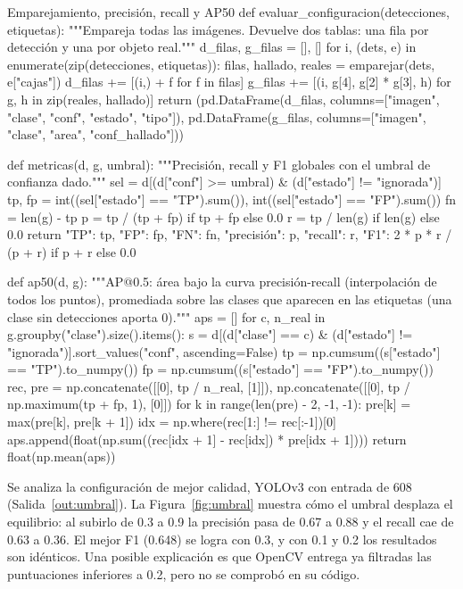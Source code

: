 \documentclass[11pt,letterpaper]{article}
\begin{document}
\begin{codigo}[label=cod:eval]{Emparejamiento, precisión, recall y AP50}
def evaluar_configuracion(detecciones, etiquetas):
    """Empareja todas las imágenes. Devuelve dos tablas: una fila por detección y una por objeto real."""
    d_filas, g_filas = [], []
    for i, (dets, e) in enumerate(zip(detecciones, etiquetas)):
        filas, hallado, reales = emparejar(dets, e["cajas"])
        d_filas += [(i,) + f for f in filas]
        g_filas += [(i, g[4], g[2] * g[3], h) for g, h in zip(reales, hallado)]
    return (pd.DataFrame(d_filas, columns=["imagen", "clase", "conf", "estado", "tipo"]),
            pd.DataFrame(g_filas, columns=["imagen", "clase", "area", "conf_hallado"]))


def metricas(d, g, umbral):
    """Precisión, recall y F1 globales con el umbral de confianza dado."""
    sel = d[(d["conf"] >= umbral) & (d["estado"] != "ignorada")]
    tp, fp = int((sel["estado"] == "TP").sum()), int((sel["estado"] == "FP").sum())
    fn = len(g) - tp
    p = tp / (tp + fp) if tp + fp else 0.0
    r = tp / len(g) if len(g) else 0.0
    return {"TP": tp, "FP": fp, "FN": fn, "precisión": p, "recall": r, "F1": 2 * p * r / (p + r) if p + r else 0.0}


def ap50(d, g):
    """AP@0.5: área bajo la curva precisión-recall (interpolación de todos los puntos), promediada sobre las
    clases que aparecen en las etiquetas (una clase sin detecciones aporta 0)."""
    aps = []
    for c, n_real in g.groupby("clase").size().items():
        s = d[(d["clase"] == c) & (d["estado"] != "ignorada")].sort_values("conf", ascending=False)
        tp = np.cumsum((s["estado"] == "TP").to_numpy())
        fp = np.cumsum((s["estado"] == "FP").to_numpy())
        rec, pre = np.concatenate([[0], tp / n_real, [1]]), np.concatenate([[0], tp / np.maximum(tp + fp, 1), [0]])
        for k in range(len(pre) - 2, -1, -1):
            pre[k] = max(pre[k], pre[k + 1])
        idx = np.where(rec[1:] != rec[:-1])[0]
        aps.append(float(np.sum((rec[idx + 1] - rec[idx]) * pre[idx + 1])))
    return float(np.mean(aps))
\end{codigo}

Se analiza la configuración de mejor calidad, YOLOv3 con entrada de 608 (Salida~\ref{out:umbral}). La Figura~\ref{fig:umbral} muestra cómo el umbral desplaza el equilibrio: al subirlo de 0.3 a 0.9 la precisión pasa de 0.67 a 0.88 y el recall cae de 0.63 a 0.36. El mejor F1 (0.648) se logra con 0.3, y con 0.1 y 0.2 los resultados son idénticos. Una posible explicación es que OpenCV entrega ya filtradas las puntuaciones inferiores a 0.2, pero no se comprobó en su código.
\end{document}
